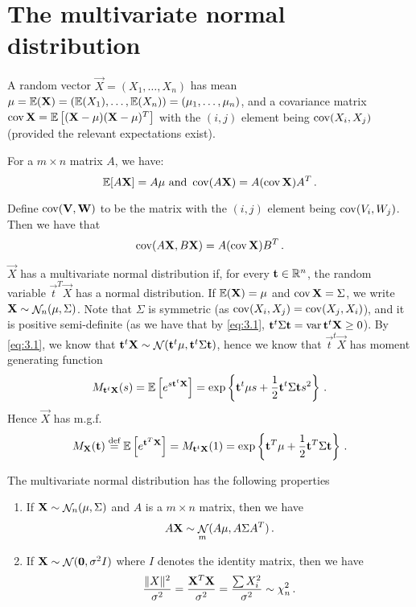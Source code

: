 \section{The multivariate normal distribution}
A random vector $\vec{X} = (X_1, \dotsc, X_n)$ has mean $\mathbf{\mu} = \mathbb{E} (\mathbf{X}) = (\mathbb{E}(X_1), \dotsc, \mathbb{E}(X_n)) = (\mu_1, \dotsc, \mu_n)$, and a covariance matrix $\operatorname{cov} \mathbf{X} = \mathbb{E} \left[ (\mathbf{X} - \mathbf{\mu})(\mathbf{X} - \mathbf{\mu})^T \right]$ with the $(i, j)$ element being $\operatorname{cov} (X_i, X_j)$ (provided the relevant expectations exist).

For a $m \times n$ matrix $A$, we have:
\begin{equation}
  \label{eq:3.1}
\mathbb{E} [A\mathbf{X}] = A \mathbf{\mu} \text{ and } \operatorname{cov} (A\mathbf{X}) = A (\operatorname{cov} \mathbf{X}) A^T \, {.}
\end{equation}

Define $\operatorname{cov}( \mathbf{V}, \mathbf{W} )$ to be the matrix with the $(i, j)$ element being $\operatorname{cov} (V_i, W_j)$. Then we have that
\[
\operatorname{cov} (A\mathbf{X}, B\mathbf{X}) = A (\operatorname{cov} \mathbf{X}) B^T \, {.}
\]

$\vec{X}$ has a multivariate normal distribution if, for every $\mathbf{t} \in \mathbb{R}^n$, the random variable $\vec{t}^T\vec{X}$ has a normal distribution.
If $\mathbb{E}(\mathbf{X}) = \mathbf{\mu}$ and $\operatorname{cov} \mathbf{X} = \Sigma$, we write $\mathbf{X} \sim \mathop{\mathcal{N}}_n (\mathbf{\mu}, \Sigma)$.
Note that $\Sigma$ is symmetric (as $\operatorname{cov} (X_i, X_j) = \operatorname{cov}(X_j, X_i)$), and it is positive semi-definite (as we have that by \eqref{eq:3.1}, $\mathbf{t}^t\Sigma\mathbf{t} = \operatorname{var} \mathbf{t}^t \mathbf{X} \geq 0$).
By \eqref{eq:3.1}, we know that $\mathbf{t}^t\mathbf{X} \sim \mathop{\mathcal{N}}(\mathbf{t}^t\mathbf{\mu}, \mathbf{t}^t\Sigma\mathbf{t})$, hence we know that $\vec{t}^t\vec{X}$ has moment generating function
\[
M_{\mathbf{t}^t\mathbf{X}}(s) = \mathbb{E}\left[ e^{s \mathbf{t}^t\mathbf{X}} \right] = \exp \left\{ \mathbf{t}^t\mathbf{\mu}s + \frac{1}{2} \mathbf{t}^t\Sigma\mathbf{t} s^2 \right\}\, {.}
\]
Hence $\vec{X}$ has m.g.f.
\begin{equation}
  \label{eq:3.2}
M_{\mathbf{X}}(\mathbf{t}) \stackrel{\text{def}}{=} \mathbb{E} \left[e^{\mathbf{t}^T\mathbf{X}}\right] = M_{\mathbf{t}^t\mathbf{X}}(1) = \exp \left\{ \mathbf{t}^T\mathbf{\mu} + \frac{1}{2}\mathbf{t}^T\Sigma\mathbf{t} \right\} \, {.}
\end{equation}

\begin{proposition}[label=prop:3.1]
The multivariate normal distribution has the following properties
\begin{enumerate}
\item If $\mathbf{X} \sim \mathop{\mathcal{N}}_n(\mathbf{\mu}, \Sigma)$ and $A$ is a $m \times n$ matrix, then we have
\[
A\mathbf{X} \sim \mathop{\mathcal{N}}_m(A\mathbf{\mu}, A \Sigma A^T) \, {.}
\]
\item If $\mathbf{X} \sim \mathop{\mathcal{N}}(\mathbf{0}, \sigma^2 I)$ where $I$ denotes the identity matrix, then we have
\[
\frac{\lVert X\rVert^2}{\sigma^2} = \frac{\mathbf{X}^T\mathbf{X}}{\sigma^2} = \frac{\sum X_i^2}{\sigma^2} \sim \chi^2_n \, {.}
\]
\end{enumerate}
\end{proposition}

